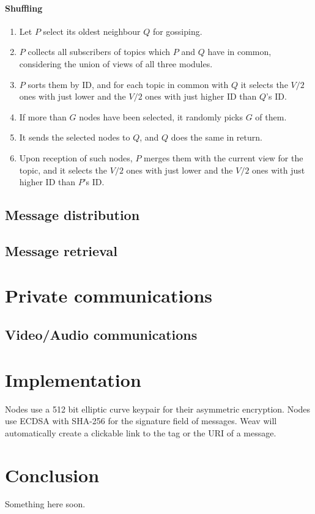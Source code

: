 \documentclass[10pt,a4paper,onecolumn]{article}
\begin{document}
\paragraph*{Shuffling}
\begin{enumerate}
\item Let $P$ select its oldest neighbour $Q$ for gossiping.
\item $P$ collects all subscribers of topics which $P$ and $Q$ have in common, considering the union of views of all three modules.
\item $P$ sorts them by ID, and for each topic in common with $Q$ it selects the $V/2$ ones with just lower and the $V/2$ ones with just higher ID than $Q$'s ID. 
\item If more than $G$ nodes have been selected, it randomly picks $G$ of them.
\item It sends the selected nodes to $Q$, and $Q$ does the same in return.
\item Upon reception of such nodes, $P$ merges them with the current view for the topic, and it selects the $V/2$ ones with just lower and the $V/2$ ones with just higher ID than $P$'s ID.
\end{enumerate}

\subsection{Message distribution}
\subsection{Message retrieval}

\section{Private communications}
\subsection*{Video/Audio communications}


\section{Implementation}
Nodes use a 512 bit elliptic curve keypair for their asymmetric encryption. Nodes use ECDSA with SHA-256 for the signature field of messages. Weav will automatically create a clickable link to the tag or the URI of a message.


\section{Conclusion}
Something here soon.

{}

\end{document}
